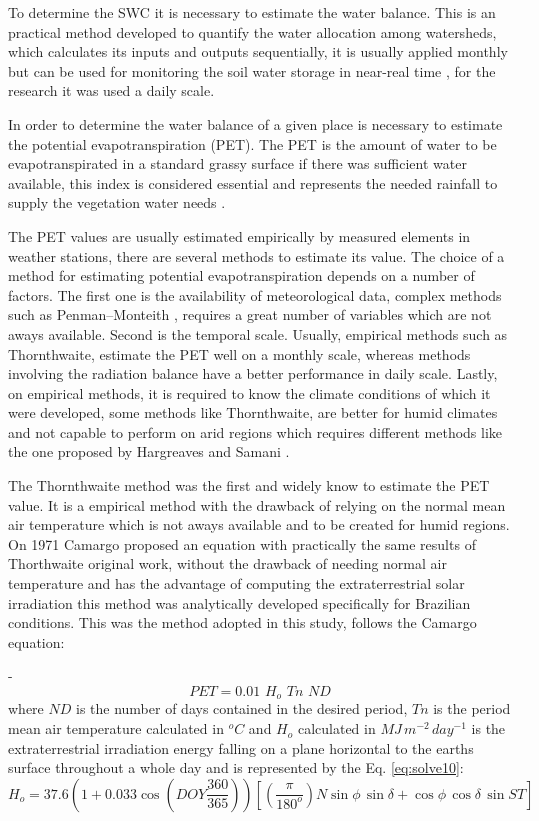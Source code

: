 To determine the SWC it is necessary to estimate the water balance. This is an practical method developed to quantify the water allocation among watersheds, which calculates its inputs and outputs sequentially, it is usually applied monthly but can be used for monitoring the soil water storage in near-real time \cite{thornthwaite1957instructions}, for the research it was used a daily scale.

In order to determine the water balance of a given place is necessary to estimate the potential evapotranspiration (PET). The PET is the amount of water to be evapotranspirated in a standard grassy surface if there was sufficient water available, this index is considered essential and represents the needed rainfall to supply the vegetation water needs \cite{de2000revisao}.

The PET values are usually estimated empirically by measured elements in weather stations, there are several methods to estimate its value. The choice of a method for estimating potential evapotranspiration depends on a number of factors. The first one is the availability of meteorological data, complex methods such as Penman–Monteith \cite{allen1998crop}, requires a great number of variables which are not aways available. Second is the temporal scale. Usually, empirical methods such as Thornthwaite, estimate the PET well on a monthly scale, whereas methods involving the radiation balance have a better performance in daily scale. Lastly, on empirical methods, it is required to know the climate conditions of which it were developed, some methods like Thornthwaite, are better for humid climates and not capable to perform on arid regions which requires different methods like the one proposed by Hargreaves and Samani \cite{hargreaves1985reference}.

The Thornthwaite method \cite{thornthwaite1948approach} was the first and widely know to estimate the PET value. It is a empirical method with the drawback of relying on the normal mean air temperature which is not aways available and to be created for humid regions. On 1971 Camargo\cite{camargo1971paulo} proposed an equation with practically the same results of Thorthwaite original work, without the drawback of needing normal air temperature and has the advantage of computing the extraterrestrial solar irradiation this method was analytically developed specifically for Brazilian conditions. This was the method adopted in this study, follows the Camargo equation:

-\begin{equation}
\label{eq:solve9}
PET = 0.01 \,\, H_o \,\, Tn \,\, ND
\end{equation}
where $ND$ is the number of days contained in the desired period, $Tn$ is the period mean air temperature calculated in $^oC$ and $H_o$ calculated in ${MJ} \, m^{-2} \, day^{-1} $ is the extraterrestrial
irradiation energy falling on a plane horizontal to the earths surface throughout a whole day and is represented by the Eq. \ref{eq:solve10}:
\begin{equation}
\label{eq:solve10}
H_o = 37.6(1 + 0.033\cos(DOY\frac{360}{365}))[(\frac{\pi}{180^o}){N} \sin\phi \, \sin\delta + \cos\phi \, \cos\delta \, \sin ST]
\end{equation}

